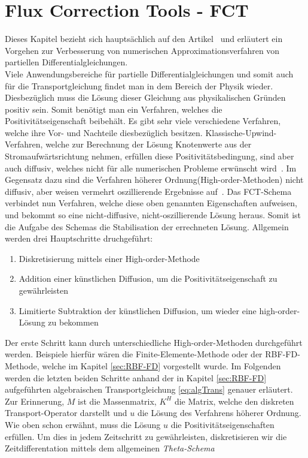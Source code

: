\documentclass[a4paper,11pt]{article}
\begin{document}
\section{Flux Correction Tools - FCT}
Dieses Kapitel bezieht sich hauptsächlich auf den Artikel~\cite{kuzmin2002flux} und erläutert ein Vorgehen zur Verbesserung von numerischen Approximationsverfahren von partiellen Differentialgleichungen.\\
Viele Anwendungsbereiche für partielle Differentialgleichungen und somit auch für die Transportgleichung findet man in dem Bereich der Physik wieder. Diesbezüglich muss die Lösung dieser Gleichung aus physikalischen Gründen positiv sein. Somit benötigt man ein Verfahren, welches die Positivitätseigenschaft beibehält. Es gibt sehr viele verschiedene Verfahren, welche ihre Vor- und Nachteile diesbezüglich besitzen. Klassische-Upwind-Verfahren, welche zur Berechnung der Lösung Knotenwerte aus der Stromaufwärtsrichtung nehmen, erfüllen diese Positivitätsbedingung, sind aber auch diffusiv, welches nicht für alle numerischen Probleme erwünscht wird~\cite{kuzmin2002flux}. Im Gegensatz dazu sind die Verfahren höherer Ordnung(High-order-Methoden) nicht diffusiv, aber weisen vermehrt oszillierende Ergebnisse auf~\cite{kuzmin2002flux}. Das FCT-Schema verbindet nun Verfahren, welche diese oben genannten Eigenschaften aufweisen, und bekommt so eine nicht-diffusive, nicht-oszillierende Lösung heraus. Somit ist die Aufgabe des Schemas die Stabilisation der errechneten Lösung. Allgemein werden drei Hauptschritte druchgeführt:
\begin{enumerate}
 \item Diskretisierung mittels einer High-order-Methode
 \item Addition einer künstlichen Diffusion, um die Positivitätseigenschaft zu gewährleisten
 \item Limitierte Subtraktion der künstlichen Diffusion, um wieder eine high-order-Lösung zu bekommen
\end{enumerate}
Der erste Schritt kann durch unterschiedliche High-order-Methoden durchgeführt werden. Beispiele hierfür wären die Finite-Elemente-Methode oder der RBF-FD-Methode, welche im Kapitel \ref{sec:RBF-FD} vorgestellt wurde. Im Folgenden werden die letzten beiden Schritte anhand der in Kapitel \ref{sec:RBF-FD} aufgeführten algebraischen Transportgleichung \eqref{eq:algTrans} genauer erläutert. Zur Erinnerung, $M$ ist die Massenmatrix, $K^H$ die Matrix, welche den diskreten Transport-Operator darstellt und $u$ die Lösung des Verfahrens höherer Ordnung. Wie oben schon erwähnt, muss die Lösung $u$ die Positivitätseigenschaften erfüllen. Um dies in jedem Zeitschritt zu gewährleisten, diskretisieren wir die Zeitdifferentation mittels dem allgemeinen \textit{Theta-Schema}
\end{document}
